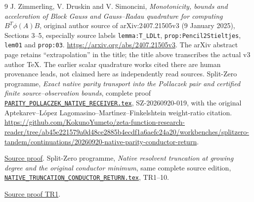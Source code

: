\documentclass[11pt]{article}
\begin{document}
\begin{thebibliography}{9}
 J. Zimmerling, V. Druskin and V. Simoncini,
\emph{Monotonicity, bounds and acceleration of Block Gauss and
Gauss--Radau quadrature for computing $B^T\phi(A)B$}, original
author source of arXiv:2407.21505v3 (9 January 2025),
Sections 3--5, especially source labels
\texttt{lemma:T\_LDLt}, \texttt{prop:Pencil2Stieltjes},
\texttt{lem01} and \texttt{prop:03}.
\url{https://arxiv.org/abs/2407.21505v3}.
The arXiv abstract page retains ``extrapolation'' in the title;
the title above transcribes the actual v3 author TeX.
The earlier scalar quadrature works cited there are human
provenance leads, not claimed here as independently read sources.
 Split-Zero programme, \emph{Exact native parity transport
into the Pollaczek pair and certified finite source--observation bounds},
complete proof \href{https://github.com/KokunoYumeto/zeta-function-research-reader/blob/5992ad50c0f2a06921f1fcaded7b4e38097c0739/workbenches/splitzero-tandem/continuations/20260920-original-kernel-mixed-determinants/providers/PARITY_POLLACZEK_NATIVE_RECEIVER.tex\#L1}{\texttt{PARITY\_POLLACZEK\_NATIVE\_RECEIVER.tex}},
SZ-20260920-019, with the original Aptekarev--L\'opez
Lagomasino--Mart\'{\i}nez--Finkelshtein weight-ratio citation.
\url{https://github.com/KokunoYumeto/zeta-function-research-reader/tree/ab45e221579a0d48ce2885b4ecdf1a6aefc24a20/workbenches/splitzero-tandem/continuations/20260920-native-parity-conductor-return}.

\href{https://github.com/KokunoYumeto/zeta-function-research-reader/blob/5992ad50c0f2a06921f1fcaded7b4e38097c0739/workbenches/splitzero-tandem/continuations/20260920-original-kernel-mixed-determinants/providers/PARITY_POLLACZEK_NATIVE_RECEIVER.tex\#L1}{Source proof}.
 Split-Zero programme, \emph{Native resolvent truncation at
growing degree and the original conductor minimum}, same complete
source edition, \href{https://github.com/KokunoYumeto/zeta-function-research-reader/blob/5992ad50c0f2a06921f1fcaded7b4e38097c0739/workbenches/splitzero-tandem/continuations/20260920-original-kernel-mixed-determinants/providers/NATIVE_TRUNCATION_CONDUCTOR_RETURN.tex\#L1}{\texttt{NATIVE\_TRUNCATION\_CONDUCTOR\_RETURN.tex}}, TR1--10.

\href{https://github.com/KokunoYumeto/zeta-function-research-reader/blob/5992ad50c0f2a06921f1fcaded7b4e38097c0739/workbenches/splitzero-tandem/continuations/20260920-original-kernel-mixed-determinants/providers/NATIVE_TRUNCATION_CONDUCTOR_RETURN.tex\#L54}{Source proof TR1}.
\end{thebibliography}
\end{document}
